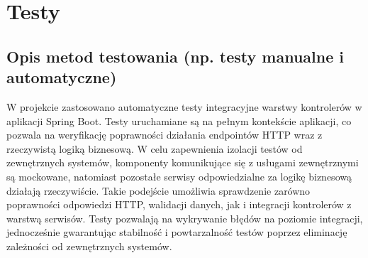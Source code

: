 \documentclass[../../spr.tex]{subfiles}
\begin{document}
\section{Testy}
\subsection{Opis metod testowania (np. testy manualne i automatyczne)}

W projekcie zastosowano automatyczne testy integracyjne warstwy kontrolerów w aplikacji Spring Boot.
Testy uruchamiane są na pełnym kontekście aplikacji,
co pozwala na weryfikację poprawności działania endpointów HTTP wraz z rzeczywistą logiką biznesową.
W celu zapewnienia izolacji testów od zewnętrznych systemów, komponenty komunikujące się z
usługami zewnętrznymi są mockowane, natomiast pozostałe serwisy odpowiedzialne za logikę biznesową
działają rzeczywiście. Takie podejście umożliwia sprawdzenie zarówno poprawności odpowiedzi HTTP,
walidacji danych, jak i integracji kontrolerów z warstwą serwisów.
Testy pozwalają na wykrywanie błędów na poziomie integracji, jednocześnie gwarantując stabilność
i powtarzalność testów poprzez eliminację zależności od zewnętrznych systemów.
\end{document}
